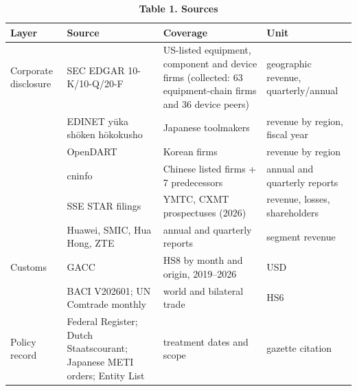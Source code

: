 \documentclass[12pt]{article}
\begin{document}
\begin{table}[htbp]\centering\footnotesize{}\caption*{\textbf{Table 1. Sources}}\begin{tabular}{@{}
  >{\raggedright\arraybackslash}p{}
  >{\raggedright\arraybackslash}p{}
  >{\raggedright\arraybackslash}p{}
  >{\raggedright\arraybackslash}p{}@{}}
\toprule
\begin{minipage}[b]{\linewidth}\raggedright
Layer
\end{minipage} & \begin{minipage}[b]{\linewidth}\raggedright
Source
\end{minipage} & \begin{minipage}[b]{\linewidth}\raggedright
Coverage
\end{minipage} & \begin{minipage}[b]{\linewidth}\raggedright
Unit
\end{minipage} \\
\midrule
Corporate disclosure & SEC EDGAR 10-K/10-Q/20-F & US-listed equipment, component and device firms (collected: 63 equipment-chain firms and 36 device peers) & geographic revenue, quarterly/annual \\
\hdashline
& EDINET yūka shōken hōkokusho & 19 Japanese toolmakers & revenue by region, fiscal year \\
\hdashline
& OpenDART & 9 Korean firms & revenue by region \\
\hdashline
& cninfo & 47 Chinese listed firms + 7 predecessors & annual and quarterly reports \\
\hdashline
& SSE STAR filings & YMTC, CXMT prospectuses (2026) & revenue, losses, shareholders \\
\hdashline
& Huawei, SMIC, Hua Hong, ZTE & annual and quarterly reports & segment revenue \\
\hdashline
Customs & GACC & HS8 by month and origin, 2019--2026 & USD \\
\hdashline
& BACI V202601; UN Comtrade monthly & world and bilateral trade & HS6 \\
\hdashline
Policy record & Federal Register; Dutch Staatscourant; Japanese METI orders; Entity List & treatment dates and scope & gazette citation \\
\bottomrule
\end{tabular}\end{table}
\end{document}
